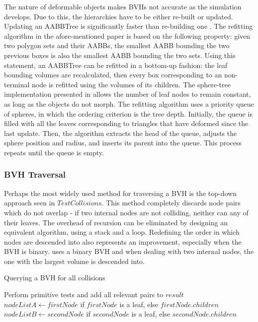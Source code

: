 The nature of deformable objects makes BVHs not accurate as the simulation develops. Due to this, the hierarchies have to be either re-built or updated. Updating an AABBTree is significantly faster than re-building one \citep{vdb97}. The refitting algorithm in the afore-mentioned paper is based on the following property: given two polygon sets and their AABBs, the smallest AABB bounding the two previous boxes is also the smallest AABB bounding the two sets. Using this statement, an AABBTree can be refitted in a bottom-up fashion: the leaf bounding volumes are recalculated, then every box corresponding to an non-terminal node is refitted using the volumes of its children. The sphere-tree implementation presented in \citep{rtsd01} allows the number of leaf nodes to remain constant, as long as the objects do not morph. The refitting algorithm uses a priority queue of spheres, in which the ordering criterion is the tree depth. Initially, the queue is filled with all the leaves corresponding to triangles that have deformed since the last update. Then, the algorithm extracts the head of the queue, adjusts the sphere position and radius, and inserts its parent into the queue. This process repeats until the queue is empty.

\subsubsection{BVH Traversal}
\label{sub-sub-sec:traversal}

Perhaps the most widely used method for traversing a BVH is the top-down approach seen in \hyperref[alg:BVHQuery]{$TestCollisions$}. This method completely discards node pairs which do not overlap - if two internal nodes are not colliding, neither can any of their leaves. The overhead of recursion can be eliminated by designing an equivalent algorithm, using a stack and a loop. Redefining the order in which nodes are descended into also represents an improvement, especially when the BVH is binary. \citep{vdb97} uses a binary BVH and when dealing with two internal nodes, the one with the largest volume is descended into.

\begin{algorithm}
	\label{alg:BVHQuery}
	\caption{Querying a BVH for all collisions}
	\begin{algorithmic}[1]
				\State Perform primitive tests and add all relevant pairs to $result$		
			\Else
				\State $nodeListA \gets firstNode$ if $firstNode$ is a leaf, else $firstNode.children$
				\State $nodeListB \gets secondNode$ if $secondNode$ is a leaf, else $secondNode.children$
					\State {}
				\EndFor
			\EndIf
		\EndIf
		\EndProcedure
	\end{algorithmic}
\end{algorithm}


